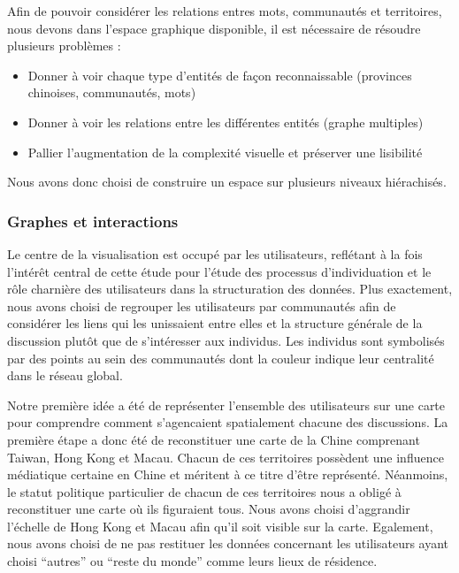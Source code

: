 Afin de pouvoir considérer les relations entres mots, communautés et
territoires, nous devons dans l{\textquoteright}espace graphique
disponible, il est nécessaire de résoudre plusieurs problèmes :

\begin{itemize}
\item Donner à voir chaque type d{\textquoteright}entités de
fa\c{c}on reconnaissable (provinces chinoises, communautés, mots)
\item Donner à voir les relations entre les différentes entités
(graphe multiples)
\item Pallier l{\textquoteright}augmentation de la complexité visuelle
et préserver une lisibilité
\end{itemize}
Nous avons donc choisi de construire un espace sur plusieurs niveaux
hiérachisés.

\subsubsection{Graphes et interactions}

Le centre de la visualisation est occupé par les utilisateurs,
reflétant à la fois l{\textquoteright}intérêt central de cette
étude pour l{\textquoteright}étude des processus
d{\textquoteright}individuation et le r\^ole charnière des
utilisateurs dans la structuration des données. Plus exactement, nous
avons choisi de regrouper les utilisateurs par communautés afin de
considérer les liens qui les unissaient entre elles et la structure
générale de la discussion plut\^ot que de
s{\textquoteright}intéresser aux individus. Les individus sont
symbolisés par des points au sein des communautés dont la couleur
indique leur centralité dans le réseau global. 

Notre première idée a été de représenter
l{\textquoteright}ensemble des utilisateurs sur une carte pour
comprendre comment s{\textquoteright}agencaient spatialement chacune
des discussions. La première étape a donc été de reconstituer
une carte de la Chine comprenant Taiwan, Hong Kong et Macau. Chacun de
ces territoires possèdent une influence médiatique certaine en
Chine et méritent à ce titre d{\textquoteright}être
représenté. Néanmoins, le statut politique particulier de chacun
de ces territoires nous a obligé à reconstituer une carte o\`u ils
figuraient tous. Nous avons choisi d{\textquoteright}aggrandir
l{\textquoteright}échelle de Hong Kong et Macau afin
qu{\textquoteright}il soit visible sur la carte. Egalement, nous avons
choisi de ne pas restituer les données concernant les utilisateurs
ayant choisi {\textquotedblleft}autres{\textquotedblright} ou
{\textquotedblleft}reste du monde{\textquotedblright} comme leurs lieux
de résidence.


